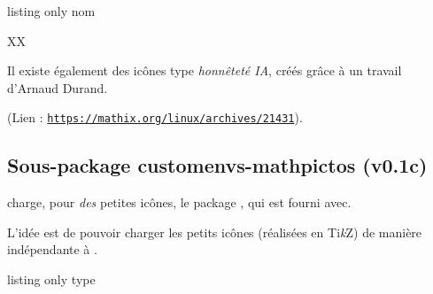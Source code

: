 \documentclass[french,11pt,a4paper]{article}
\providecommand\tikzlogo{Ti\textit{k}Z}
\let\TikZ\tikzlogo
\begin{document}
\begin{DemoCode}{listing only}
%
  {nom}
\end{DemoCode}

\begin{DemoCode}{}
{\Huge XX}
\end{DemoCode}

\begin{DemoCode}{}
\end{DemoCode}

\begin{DemoCode}{}
\end{DemoCode}

\pagebreak

Il existe également des icônes type \textit{honnêteté IA}, créés grâce à un travail d'Arnaud Durand.

(Lien : \texttt{\url{https://mathix.org/linux/archives/21431}}).

\begin{DemoCode}{}

\end{DemoCode}

\subsection{Sous-package customenvs-mathpictos (v0.1c)}

 charge, pour \textit{des} petites icônes, le package , qui est fourni avec.

L'idée est de pouvoir charger les petits icônes (réalisées en \TikZ) de manière indépendante à .

\begin{DemoCode}{listing only}
%
  {type}
\end{DemoCode}

\begin{DemoCode}{}
%
\end{DemoCode}
\end{document}

